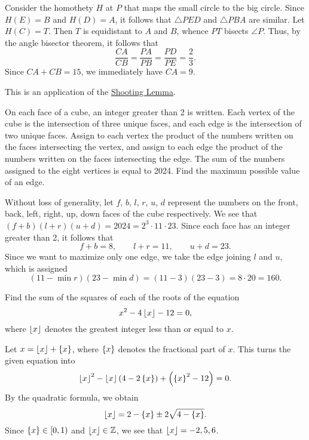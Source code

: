 Consider the homothety $H$ at $P$ that maps the small circle to the big circle. Since $H(E) = B$ and $H(D) = A$, it follows that $\triangle PED$ and $\triangle PBA$ are similar. Let $H(C) = T$. Then $T$ is equidistant to $A$ and $B$, whence $PT$ bisects $\angle P$. Thus, by the angle bisector theorem, it follows that \[\frac{CA}{CB} = \frac{PA}{PB} = \frac{PD}{PE} = \frac{2}{3}.\] Since $CA + CB = 15$, we immediately have $CA = 9$.

\begin{remark}
    This is an application of the \href{https://web.evanchen.cc/handouts/GeoSlang/GeoSlang.pdf}{Shooting Lemma}.
\end{remark}

\begin{question}[160]\label{A::2024-S-1-18}
    On each face of a cube, an integer greater than 2 is written. Each vertex of the cube is the intersection of three unique faces, and each edge is the intersection of two unique faces. Assign to each vertex the product of the numbers written on the faces intersecting the vertex, and assign to each edge the product of the numbers written on the faces intersecting the edge. The sum of the numbers assigned to the eight vertices is equal to 2024. Find the maximum possible value of an edge.
\end{question}

Without loss of generality, let $f$, $b$, $l$, $r$, $u$, $d$ represent the numbers on the front, back, left, right, up, down faces of the cube respectively. We see that $(f + b)(l + r)(u + d) = 2024 = 2^3 \cdot 11 \cdot 23$. Since each face has an integer greater than 2, it follows that \[f + b = 8, \qquad l + r = 11, \qquad u + d = 23.\] Since we want to maximize only one edge, we take the edge joining $l$ and $u$, which is assigned \[(11 - \min r)(23 - \min d) = (11-3)(23-3) = 8 \cdot 20 = 160.\]

\begin{question}[72]\label{A::2024-S-1-19}
    Find the sum of the squares of each of the roots of the equation \[x^2 - 4\left\lfloor x \right\rfloor - 12 = 0,\] where $\left\lfloor x \right\rfloor$ denotes the greatest integer less than or equal to $x$.
\end{question}

Let $x = \left\lfloor x \right\rfloor + \left\lbrace x \right\rbrace$, where $\left\lbrace x \right\rbrace$ denotes the fractional part of $x$. This turns the given equation into \[\left\lfloor x \right\rfloor^2 - \left\lfloor x \right\rfloor\left( 4 - 2\left\lbrace x \right\rbrace \right) + \left( \left\lbrace x \right\rbrace^2 - 12 \right) = 0.\] By the quadratic formula, we obtain \[\left\lfloor x \right\rfloor = 2 - \left\lbrace x \right\rbrace \pm 2\sqrt{4 - \left\lbrace x \right\rbrace}.\] Since $\left\lbrace x \right\rbrace \in [0, 1)$ and $\left\lfloor x \right\rfloor \in \mathbb{Z}$, we see that $\left\lfloor x \right\rfloor = -2, 5, 6$.

